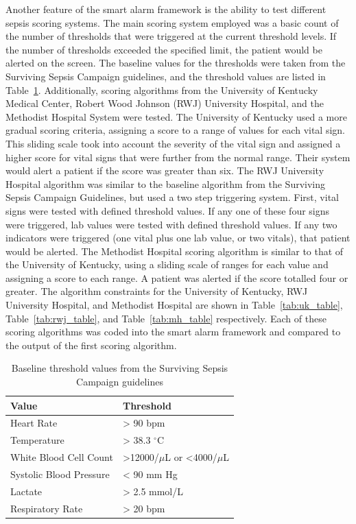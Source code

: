 \documentclass{sig-alternate}
\begin{document}
Another feature of the smart alarm framework is the ability to test different sepsis scoring systems.  The main scoring system employed was a basic count of the number of thresholds that were triggered at the current threshold levels.  If the number of thresholds exceeded the specified limit, the patient would be alerted on the screen.  The baseline values for the thresholds were taken from the Surviving Sepsis Campaign guidelines, and the threshold values are listed in Table~\ref{tab:threshold_table}.  
Additionally, scoring algorithms from the University of Kentucky Medical Center, Robert Wood Johnson (RWJ) University Hospital, and the Methodist Hospital System were tested.  The University of Kentucky used a more gradual scoring criteria, assigning a score to a range of values for each vital sign.  This sliding scale took into account the severity of the vital sign and assigned a higher score for vital signs that were further from the normal range.  Their system would alert a patient if the score was greater than six.  The RWJ University Hospital algorithm was similar to the baseline algorithm from the Surviving Sepsis Campaign Guidelines, but used a two step triggering system.  First, vital signs were tested with defined threshold values.  If any one of these four signs were triggered, lab values were tested with defined threshold values.  If any two indicators were triggered (one vital plus one lab value, or two vitals), that patient would be alerted.  The Methodist Hospital scoring algorithm is similar to that of the University of Kentucky, using a sliding scale of ranges for each value and assigning a score to each range.  A patient was alerted if the score totalled four or greater.  The algorithm constraints for the University of Kentucky, RWJ University Hospital, and Methodist Hospital are shown in Table~\ref{tab:uk_table}, Table~\ref{tab:rwj_table}, and Table~\ref{tab:mh_table} respectively.  Each of these scoring algorithms was coded into the smart alarm framework and compared to the output of the first scoring algorithm.

\begin{table}
\renewcommand{\arraystretch}{1.5}
  \begin{tabular}{| l | l |}
\hline

{\bf Value} & {\bf Threshold}\\ \hline
Heart Rate & > 90 bpm\\ \hline
Temperature & > 38.3 $^\circ$C\\ \hline
White Blood Cell Count & >12000/$\mu$L  or <4000/$\mu$L\\ \hline
Systolic Blood Pressure & < 90 mm Hg\\ \hline
Lactate & > 2.5 mmol/L\\ \hline
Respiratory Rate & > 20 bpm\\ \hline

 \end{tabular}
	\caption{Baseline threshold values from the Surviving Sepsis Campaign guidelines}
  \label{tab:threshold_table}
\end{table}
\end{document}
